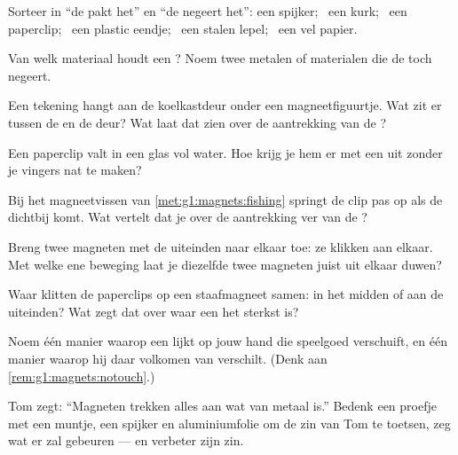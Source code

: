 \begin{exercise}[$\star$]\label{exo:g1:magnets:1}
Sorteer in ``de  pakt het'' en ``de  negeert het'': een
spijker; \ een kurk; \ een paperclip; \ een plastic eendje; \ een
stalen lepel; \ een vel papier.
\end{exercise}

\begin{exercise}[$\star$]\label{exo:g1:magnets:2}
Van welk materiaal houdt een ? Noem twee metalen of materialen
die de  toch negeert.
\end{exercise}

\begin{exercise}[$\star$]\label{exo:g1:magnets:3}
Een tekening hangt aan de koelkastdeur onder een magneetfiguurtje. Wat
zit er tussen de  en de deur? Wat laat dat zien over de
aantrekking van de ?
\end{exercise}

\begin{exercise}[$\star$]\label{exo:g1:magnets:4}
Een paperclip valt in een glas vol water. Hoe krijg je hem er met een
 uit zonder je vingers nat te maken?
\end{exercise}

\begin{exercise}[$\star$]\label{exo:g1:magnets:5}
Bij het magneetvissen van \cref{met:g1:magnets:fishing} springt de clip
pas op als de  dichtbij komt. Wat vertelt dat je over de
aantrekking ver van de ?
\end{exercise}

\begin{exercise}[$\star$]\label{exo:g1:magnets:6}
Breng twee magneten met de uiteinden naar elkaar toe: ze klikken aan
elkaar. Met welke ene beweging laat je diezelfde twee magneten juist
uit elkaar duwen?
\end{exercise}

\begin{exercise}[$\star$]\label{exo:g1:magnets:7}
Waar klitten de paperclips op een staafmagneet samen: in het midden of
aan de uiteinden? Wat zegt dat over waar een  het sterkst is?
\end{exercise}

\begin{exercise}[$\star$]\label{exo:g1:magnets:8}
Noem één manier waarop een  lijkt op jouw hand die speelgoed
verschuift, en één manier waarop hij daar volkomen van verschilt.
(Denk aan \cref{rem:g1:magnets:notouch}.)
\end{exercise}

\begin{exercise}[$\star\star$]\label{exo:g1:magnets:9}
Tom zegt: ``Magneten trekken alles aan wat van metaal is.'' Bedenk
een proefje met een muntje, een spijker en aluminiumfolie om de zin
van Tom te toetsen, zeg wat er zal gebeuren --- en verbeter zijn zin.
\end{exercise}
